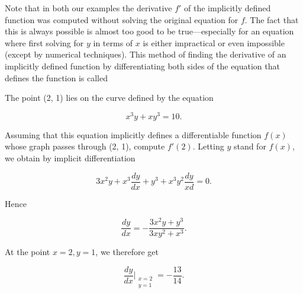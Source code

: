 Note that in both our examples
the derivative $f'$ of the implicitly defined function
was computed without solving the original equation for $f$.
The fact that this is always possible
is almost too good to be true---especially for an equation
where first solving for $y$ in terms of $x$
is either impractical or even impossible (except by numerical techniques).
This method of finding the derivative of an implicitly defined function
by differentiating both sides of the equation that defines the function
is called 

\begin{example}
The point (2, 1) lies on the curve defined by the equation

$$
{x^3}y + xy^3 = 10.
$$

Assuming that this equation implicitly defines a differentiable function $f(x)$ whose graph passes through (2, 1), compute $f'(2)$. Letting $y$ stand for $f(x)$, we obtain by implicit differentiation

$$
3{x^2}y + {x^3} \frac{dy}{dx} + y^3 + {x^3}{y^2} \frac{dy}{xd} = 0.
$$

Hence

$$
\frac{dy}{dx} = -\frac{3{x^2}y+ y^3}{3x{y^2} + x^3} .
$$

At the point $x = 2, y = 1$, we therefore get

$$
\frac{dy}{dx} \Big|_{\begin{array}{l}
                                x=2 \\ y=1
                              \end{array}
} = -\frac{13}{14}.
$$
\end{example}
